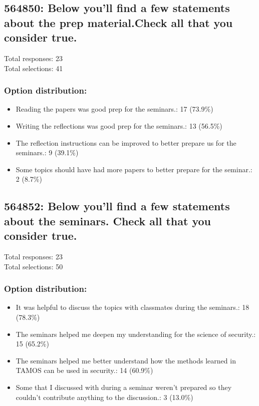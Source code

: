\documentclass[a4paper]{report}
\begin{document}
\subsection{564850: Below you'll find a few statements about the prep material.Check all that you consider true.}

Total responses: 23\\
Total selections: 41\\

\subsubsection{Option distribution:}
\begin{itemize}
  \item Reading the papers was good prep for the seminars.: 17 (73.9\%)
  \item Writing the reflections was good prep for the seminars.: 13 (56.5\%)
  \item The reflection instructions can be improved to better prepare us for the seminars.: 9 (39.1\%)
  \item Some topics should have had more papers to better prepare for the seminar.: 2 (8.7\%)
\end{itemize}

\subsection{564852: Below you'll find a few statements about the seminars. Check all that you consider true.}

Total responses: 23\\
Total selections: 50\\

\subsubsection{Option distribution:}
\begin{itemize}
  \item It was helpful to discuss the topics with classmates during the seminars.: 18 (78.3\%)
  \item The seminars helped me deepen my understanding for the science of security.: 15 (65.2\%)
  \item The seminars helped me better understand how the methods learned in TAMOS can be used in security.: 14 (60.9\%)
  \item Some that I discussed with during a seminar weren't prepared so they couldn't contribute anything to the discussion.: 3 (13.0\%)
\end{itemize}
\end{document}
